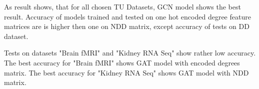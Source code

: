 As result shows, that for all chosen TU Datasets, GCN model shows the best result. Accuracy of models trained and tested on one hot encoded degree feature matrices
are is higher then one on NDD matrix, except accuracy of tests on DD dataset.

Tests on datasets "Brain fMRI" and "Kidney RNA Seq" show rather low accuracy. The best accuracy for "Brain fMRI" shows GAT model with encoded degrees matrix. 
The best accuracy for "Kidney RNA Seq" shows GAT model with NDD matrix. 
